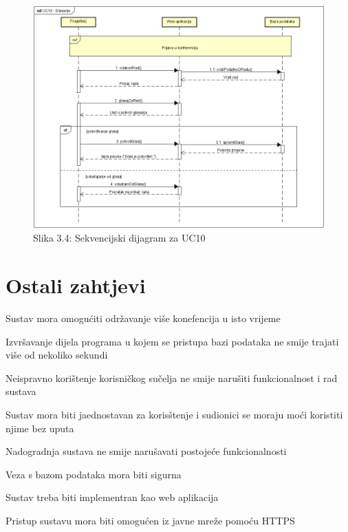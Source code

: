 		\begin{figure}[H]
			\includegraphics[scale=0.7]{slike/UC10.PNG} 
			\centering
			\caption{Slika 3.4: Sekvencijski dijagram za UC10}
			\label{fig:UC10}
		\end{figure}		
		\newpage
		\section{Ostali zahtjevi}
		\begin{packed_item}

			\item Sustav mora omogućiti održavanje više konefencija u isto vrijeme
			\item Izvršavanje dijela programa u kojem se pristupa bazi podataka ne smije trajati više od nekoliko sekundi
			\item Neispravno korištenje korisničkog sučelja ne smije narušiti funkcionalnost i rad sustava
			\item Sustav mora biti jaednostavan za korisštenje i sudionici se moraju moći koristiti njime bez uputa
			\item Nadogradnja sustava ne smije narušavati postojeće funkcionalnosti
			\item Veza s bazom podataka mora biti sigurna
			\item Sustav treba biti implementran kao web aplikacija
			\item Pristup sustavu mora biti omogućen iz javne mreže pomoću HTTPS

		\end{packed_item}

			 
	